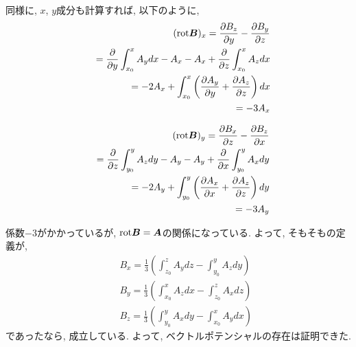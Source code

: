 \documentclass{jsarticle} \usepackage[dvipdfmx]{graphicx} \usepackage[dvipdfmx]{hyperref}
\newcommand*{\mbold}[1]{\mbox{\boldmath $#1$}}
\newcommand*{\rot}{{\rm rot}}
\begin{document}
同様に, $x$, $y$成分も計算すれば, 以下のように,  
\begin{eqnarray*}
  && (\rot\mbold{B})_x = \frac{\partial B_z}{\partial y} - \frac{\partial B_y}{\partial z} \nonumber \\
  && = \frac{\partial}{\partial y}\int_{x_0}^x A_y dx - A_x 
    - A_x + \frac{\partial}{\partial z}\int_{x_0}^x A_z dx \nonumber \\
  && = -2 A_x + \int_{x_0}^x \left(\frac{\partial A_y}{\partial y} + \frac{\partial A_z}{\partial z}\right)dx \nonumber \\
  && = -3 A_x
\end{eqnarray*}

\begin{eqnarray*}
  && (\rot\mbold{B})_y = \frac{\partial B_x}{\partial z} - \frac{\partial B_z}{\partial x} \nonumber \\
  && = \frac{\partial}{\partial z}\int_{y_0}^y A_z dy - A_y 
    - A_y + \frac{\partial}{\partial x}\int_{y_0}^y A_x dy \nonumber \\
  && = -2 A_y + \int_{y_0}^y \left(\frac{\partial A_x}{\partial x} + \frac{\partial A_z}{\partial z}\right)dy \nonumber \\
  && = -3 A_y
\end{eqnarray*}

係数$-3$がかかっているが, $\rot\mbold{B} = \mbold{A}$の関係になっている. 
よって, そもそもの定義が, 
\begin{subequations}
  \begin{eqnarray}
    && B_x = \frac{1}{3}\left(\int_{z_0}^z A_y dz - \int_{y_0}^y A_z dy \right)  \\
    && B_y = \frac{1}{3}\left(\int_{x_0}^x A_z dx - \int_{z_0}^z A_x dz \right)  \\
    && B_z = \frac{1}{3}\left(\int_{y_0}^y A_x dy - \int_{x_0}^x A_y dx \right)
  \end{eqnarray}
\end{subequations}
であったなら, 成立している. 
よって, ベクトルポテンシャルの存在は証明できた. 
\end{document}
